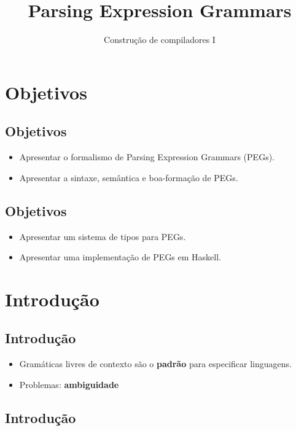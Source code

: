 \documentclass[11pt]{article}
\author{Construção de compiladores I}
\date{}
\title{Parsing Expression Grammars}
\begin{document}
\maketitle
\section*{Objetivos}
\label{sec:org7e89929}

\subsection*{Objetivos}
\label{sec:orgbf22bb0}

\begin{itemize}
\item Apresentar o formalismo de Parsing Expression Grammars (PEGs).

\item Apresentar a sintaxe, semântica e boa-formação de PEGs.
\end{itemize}
\subsection*{Objetivos}
\label{sec:org5684def}

\begin{itemize}
\item Apresentar um sistema de tipos para PEGs.

\item Apresentar uma implementação de PEGs em Haskell.
\end{itemize}
\section*{Introdução}
\label{sec:org23d03f7}

\subsection*{Introdução}
\label{sec:org33fa66a}

\begin{itemize}
\item Gramáticas livres de contexto são o \textbf{padrão} para especificar linguagens.

\item Problemas: \textbf{ambiguidade}
\end{itemize}
\subsection*{Introdução}
\label{sec:org6e0895e}
\end{document}
